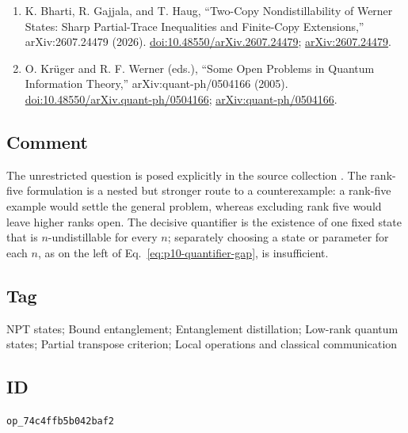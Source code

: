 \begin{enumerate}[label={},leftmargin=4.8em,labelsep=0.5em]
  \item[\textup{[BGH26]}]\label{ref:p10-bharti-et-al}
  K. Bharti, R. Gajjala, and T. Haug,
  ``Two-Copy Nondistillability of Werner States: Sharp Partial-Trace
  Inequalities and Finite-Copy Extensions,'' arXiv:2607.24479 (2026).
  \href{https://doi.org/10.48550/arXiv.2607.24479}%
       {doi:10.48550/arXiv.2607.24479};
  \href{https://arxiv.org/abs/2607.24479}{arXiv:2607.24479}.

  \item[\textup{[KW05]}]\label{ref:p10-krueger-werner}
  O. Kr\"uger and R. F. Werner (eds.),
  ``Some Open Problems in Quantum Information Theory,''
  arXiv:quant-ph/0504166 (2005).
  \href{https://doi.org/10.48550/arXiv.quant-ph/0504166}%
       {doi:10.48550/arXiv.quant-ph/0504166};
  \href{https://arxiv.org/abs/quant-ph/0504166}%
       {arXiv:quant-ph/0504166}.
\end{enumerate}

\subsection*{Comment}

The unrestricted question is posed explicitly in the source collection
.  The rank-five formulation is a
nested but stronger route to a counterexample: a rank-five example would
settle the general problem, whereas excluding rank five would leave higher
ranks open.  The decisive quantifier is the existence of one fixed state that
is $n$-undistillable for every $n$; separately choosing a state or parameter
for each $n$, as on the left of Eq.~\eqref{eq:p10-quantifier-gap}, is
insufficient.

\subsection*{Tag}

NPT states; Bound entanglement; Entanglement distillation;
Low-rank quantum states; Partial transpose criterion;
Local operations and classical communication

\subsection*{ID}

\texttt{op\_74c4ffb5b042baf2}
